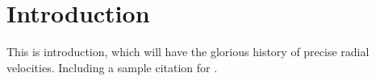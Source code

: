 \chapter{Introduction}

This is introduction, which will have the glorious history of precise
radial velocities. Including a sample citation for \cite{butler1996}.
